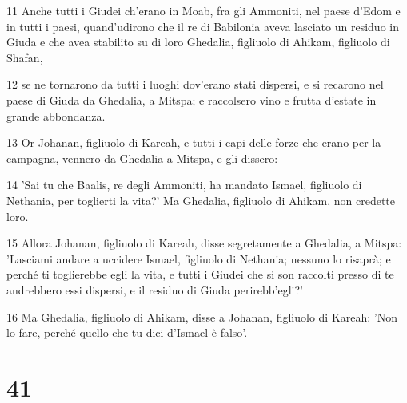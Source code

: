 \par 11 Anche tutti i Giudei ch'erano in Moab, fra gli Ammoniti, nel paese d'Edom e in tutti i paesi, quand'udirono che il re di Babilonia aveva lasciato un residuo in Giuda e che avea stabilito su di loro Ghedalia, figliuolo di Ahikam, figliuolo di Shafan,
\par 12 se ne tornarono da tutti i luoghi dov'erano stati dispersi, e si recarono nel paese di Giuda da Ghedalia, a Mitspa; e raccolsero vino e frutta d'estate in grande abbondanza.
\par 13 Or Johanan, figliuolo di Kareah, e tutti i capi delle forze che erano per la campagna, vennero da Ghedalia a Mitspa, e gli dissero:
\par 14 'Sai tu che Baalis, re degli Ammoniti, ha mandato Ismael, figliuolo di Nethania, per toglierti la vita?' Ma Ghedalia, figliuolo di Ahikam, non credette loro.
\par 15 Allora Johanan, figliuolo di Kareah, disse segretamente a Ghedalia, a Mitspa: 'Lasciami andare a uccidere Ismael, figliuolo di Nethania; nessuno lo risaprà; e perché ti toglierebbe egli la vita, e tutti i Giudei che si son raccolti presso di te andrebbero essi dispersi, e il residuo di Giuda perirebb'egli?'
\par 16 Ma Ghedalia, figliuolo di Ahikam, disse a Johanan, figliuolo di Kareah: 'Non lo fare, perché quello che tu dici d'Ismael è falso'.

\chapter{41}


